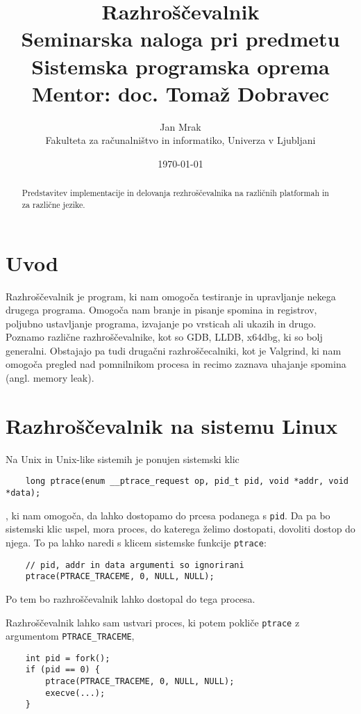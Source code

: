 \documentclass[a4paper,notitlepage]{article}
\author{Jan Mrak \\
    \small Fakulteta za računalništvo in informatiko, Univerza v Ljubljani}
\title{Razhroščevalnik\\
    \small Seminarska naloga pri predmetu Sistemska programska oprema
    \\
    \small Mentor: doc. Tomaž Dobravec}
\date{\today}
\newcommand{\code}[1]{\texttt{#1}}
\begin{document}
\maketitle
\thispagestyle{empty}

\begin{abstract}
	Predstavitev implementacije in delovanja rezhroščevalnika na različnih platformah in za različne jezike.
\end{abstract}

\section{Uvod}

Razhroščevalnik je program, ki nam omogoča testiranje in upravljanje nekega drugega programa. Omogoča nam branje in pisanje spomina in registrov, poljubno ustavljanje programa, izvajanje po vrsticah ali ukazih in drugo.
Poznamo različne razhroščevalnike, kot so GDB, LLDB, x64dbg, ki so bolj generalni. Obstajajo pa tudi drugačni razhroščecalniki, kot je Valgrind, ki nam omogoča pregled nad pomnilnikom procesa in recimo zaznava uhajanje spomina (angl. memory leak).

\section{Razhroščevalnik na sistemu Linux}

Na Unix in Unix-like sistemih je ponujen sistemski klic
\begin{verbatim}
    long ptrace(enum __ptrace_request op, pid_t pid, void *addr, void *data);    
\end{verbatim}
, ki nam omogoča, da lahko dostopamo do prcesa podanega s \code{pid}. Da pa bo sistemski klic uspel, mora proces, do katerega želimo dostopati, dovoliti dostop do njega.
To pa lahko naredi s klicem sistemske funkcije \code{ptrace}:
\begin{verbatim}
    // pid, addr in data argumenti so ignorirani
    ptrace(PTRACE_TRACEME, 0, NULL, NULL);
\end{verbatim}

Po tem bo razhroščevalnik lahko dostopal do tega procesa.

Razhroščevalnik lahko sam ustvari proces, ki potem pokliče \code{ptrace} z argumentom \code{PTRACE_TRACEME},

\begin{verbatim}
    int pid = fork();
    if (pid == 0) {
        ptrace(PTRACE_TRACEME, 0, NULL, NULL);
        execve(...);
    }
\end{verbatim}
\end{document}
